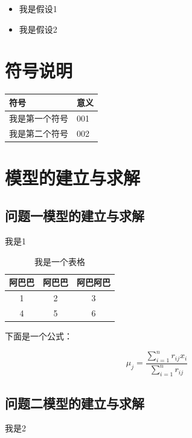 \documentclass[UTF8,12pt]{ctexart}
\begin{document}
	\begin{itemize}
		
		\item 我是假设1
		\item 我是假设2
		
	\end{itemize}
	
	\section{符号说明}
	\begin{longtable}[htbp]{p{8cm}<{\centering}p{7.5cm}}
		\toprule  %
		符号 & 意义 \\
		\midrule  %
		我是第一个符号 & 001 \\
		我是第二个符号 & 002 \\
		\bottomrule %
	\end{longtable}
	
	
	\section{模型的建立与求解}
	
	\subsection{问题一模型的建立与求解}
	
	我是1
	
	\begin{table}[htbp]
		\centering
		\caption{我是一个表格}
		\begin{tabular}{c c c}
			\hline
			阿巴巴 & 阿巴巴 & 阿巴阿巴 \\
			\hline
			1 & 2 & 3\\
			4 & 5 & 6\\  
			\hline
		\end{tabular}
	\end{table}
	
	下面是一个公式：
	
	\begin{equation}
		\mu_j = \frac{\sum_{i=1}^{n} r_{ij} x_i}{\sum_{i=1}^{n} r_{ij}}
	\end{equation}
	
	\subsection{问题二模型的建立与求解}
	
	我是2
	
\end{document}
